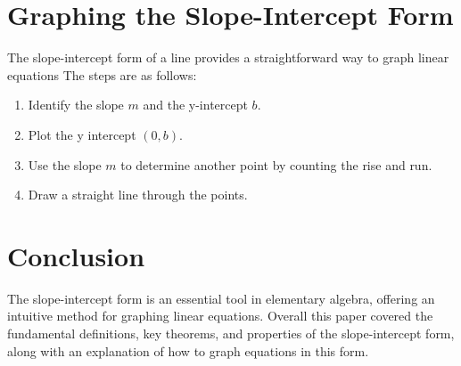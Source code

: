 \documentclass[10pt]{article}
\begin{document}
\section{\textbf{Graphing the Slope-Intercept Form}}
The slope-intercept form of a line provides a straightforward way to graph linear equations The steps are as follows:

\begin{enumerate}
    \item Identify the slope \( m \) and the y-intercept \( b \).
        \item Plot the y intercept \( (0, b) \).
            \item Use the slope \( m \) to determine another point by counting the rise and run.
                \item Draw a straight line through the points. 
\end{enumerate}

\section{\textbf{Conclusion}}
The slope-intercept form is an essential tool in elementary algebra, offering an intuitive method for graphing linear equations. Overall this paper covered the fundamental definitions, key theorems, and properties of the slope-intercept form, along with an explanation of how to graph equations in this form.
\end{document}
